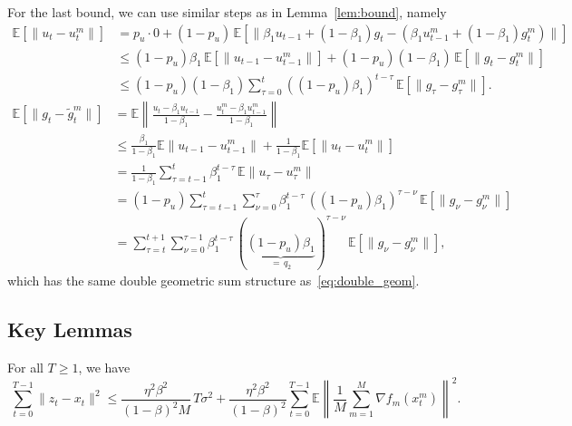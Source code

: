 For the last bound, we can use similar steps as in Lemma~\ref{lem:bound}, namely
\begin{align*}
\mathbb{E}[\|u_t - u_t^m\|]
&= p_u \cdot 0 + (1-p_u)\,\mathbb{E}[\|\beta_1 u_{t-1} + (1-\beta_1)g_t - (\beta_1 u_{t-1}^m + (1-\beta_1)g_t^m)\|] \\
&\leq (1-p_u)\beta_1\,\mathbb{E}[\|u_{t-1}-u_{t-1}^m\|] + (1-p_u)(1-\beta_1)\,\mathbb{E}[\|g_t - g_t^m\|] \\
&\leq (1-p_u)(1-\beta_1)\sum_{\tau=0}^{t}((1-p_u)\beta_1)^{t-\tau}\,\mathbb{E}[\|g_\tau - g_\tau^m\|].
\end{align*}
\begin{align*}
\mathbb{E}[\|g_t - \widetilde{g}_t^m\|]
&= \mathbb{E}\left\|\frac{u_t - \beta_1 u_{t-1}}{1-\beta_1} - \frac{u_t^m - \beta_1 u_{t-1}^m}{1-\beta_1}\right\| \\
&\leq \frac{\beta_1}{1-\beta_1}\mathbb{E}\|u_{t-1}-u_{t-1}^m\| + \frac{1}{1-\beta_1}\mathbb{E}[\|u_t - u_t^m\|] \\
&= \frac{1}{1-\beta_1}\sum_{\tau=t-1}^{t}\beta_1^{t-\tau}\,\mathbb{E}\|u_\tau - u_\tau^m\| \\
&= (1-p_u)\sum_{\tau=t-1}^{t}\sum_{\nu=0}^{\tau}\beta_1^{t-\tau}\,((1-p_u)\beta_1)^{\tau-\nu}\,\mathbb{E}[\|g_\nu - g_\nu^m\|] \\
&= \sum_{\tau=t}^{t+1}\sum_{\nu=0}^{\tau-1}\beta_1^{t-\tau}\,(\underbrace{(1-p_u)\beta_1}_{=\,q_2})^{\tau-\nu}\,\mathbb{E}[\|g_\nu - g_\nu^m\|],
\end{align*}
which has the same double geometric sum structure as~\eqref{eq:double_geom}.

\subsection{Key Lemmas}
\label{sec:key_lemmas}

\begin{lemma}
\label{lem:virt_drift}
For all $T \geq 1$, we have
\begin{equation}
\label{eq:lem2}
\sum_{t=0}^{T-1}\|z_t - x_t\|^2
\leq \frac{\eta^2\beta^2}{(1-\beta)^2 M}\,T\sigma^2
   + \frac{\eta^2\beta^2}{(1-\beta)^2}\sum_{t=0}^{T-1}\mathbb{E}\left\|\frac{1}{M}\sum_{m=1}^{M}\nabla f_m(x_t^m)\right\|^2.
\end{equation}
\end{lemma}

